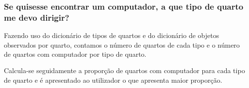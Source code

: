\subsubsection{Se quisesse encontrar um computador, a que tipo de quarto me devo dirigir?}
\label{chap2:subsec:q4}

Fazendo uso do dicionário de tipos de quartos e do dicionário de objetos observados por quarto, contamos o número de quartos de cada tipo e o número de quartos com computador por tipo de quarto.

Calcula-se seguidamente a proporção de quartos com computador para cada tipo de quarto e é apresentado ao utilizador o que apresenta maior proporção.
